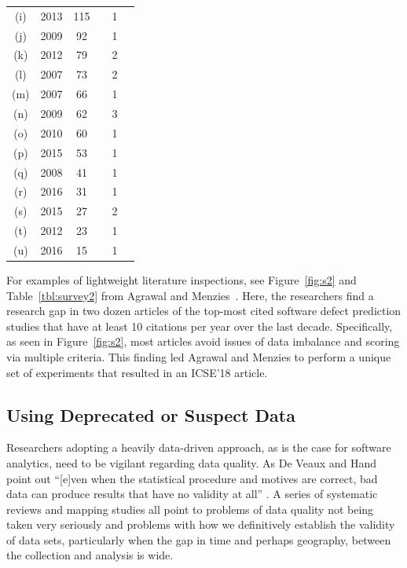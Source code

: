 \documentclass[preprint,10pt]{elsarticle}
\newcommand{\cmark}{\ding{51}}%
\newcommand{\xmark}{\ding{55}}%
\begin{document}
\begin{table}[!t]
\begin{tabular}{c|c|c|c|c|c}
         (i)& 2013 & 115 & \cmark & 1 & \cmark \\  
       (j) & 2009 & 92 & \cmark & 1 & \xmark \\          
        (k) & 2012 & 79 & \cmark & 2 & \xmark  \\ 
         (l) & 2007 & 73 & \xmark & 2 & \cmark\\  
         (m)& 2007 & 66 & \xmark & 1 & \cmark \\  
       (n) & 2009 & 62 & \cmark & 3 & \xmark  \\ 
   (o)& 2010 & 60 & \cmark & 1 & \cmark  \\  
        (p) & 2015 & 53 & \cmark & 1 & \xmark  \\  
         (q) & 2008 & 41 & \cmark & 1 & \xmark  \\  
         (r) & 2016 & 31 & \cmark & 1 & \xmark  \\ 
       (s) & 2015 & 27 & \xmark & 2 & \cmark \\  
        (t) & 2012 & 23 & \xmark & 1 & \cmark \\  
        (u) & 2016 & 15 & \cmark & 1 & \xmark  
\end{tabular}
\vspace{-0.3cm}
\end{table}



For examples of lightweight literature inspections, see Figure~\ref{fig:s2} and Table~\ref{tbl:survey2} from Agrawal and Menzies~\cite{agrawal18}. Here, the researchers find a research gap in two dozen articles of
the top-most cited software defect prediction studies that have at least 10 citations per year over the last decade. Specifically, as seen in Figure~\ref{fig:s2}, most articles avoid issues of data imbalance and scoring via multiple criteria.  This finding led Agrawal and Menzies to perform a unique set of experiments that resulted in an ICSE'18 article. 



\subsection{Using Deprecated or Suspect Data}

Researchers adopting a heavily data-driven approach, as is the case for software analytics, need to be vigilant regarding data quality.  As De Veaux and Hand point out ``[e]ven when the statistical procedure and motives are correct, bad data can produce results that have no validity at all'' \cite{DeVe05}.  A series of systematic reviews and mapping studies \cite{Lieb08,Bosu13,Rosl13,Lieb16} all point to problems of data quality not being taken very seriously and problems with how we definitively establish the validity of data sets, particularly when the gap in time and perhaps geography, between the collection and analysis is wide.
\end{document}
